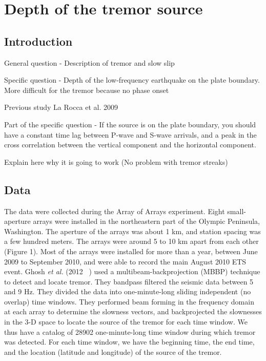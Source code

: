 \documentclass[main.tex]{subfiles}
\begin{document}
\part{Depth of the tremor source}

\chapter{Introduction}

General question - Description of tremor and slow slip

Specific question - Depth of the low-frequency earthquake on the plate boundary. More difficult for the tremor because no phase onset

Previous study La Rocca et al. 2009

Part of the specific question - If the source is on the plate boundary, you should have a constant time lag between P-wave and S-wave arrivals, and a peak in the cross correlation between the vertical component and the horizontal component.

Explain here why it is going to work (No problem with tremor streaks)

\chapter{Data}

The data were collected during the Array of Arrays experiment. Eight small-aperture arrays were installed in the northeastern part of the Olympic Peninsula, Washington. The aperture of the arrays was about 1 km, and station spacing was a few hundred meters. The arrays were around 5 to 10 km apart from each other (Figure 1). Most of the arrays were installed for more than a year, between June 2009 to September 2010, and were able to record the main August 2010 ETS event. Ghosh \textit{et al.} (2012 ~\cite{GHO_2012}) used a multibeam-backprojection (MBBP) technique to detect and locate tremor. They bandpass filtered the seismic data between 5 and 9 Hz. They divided the data into one-minute-long sliding independent (no overlap) time windows. They performed beam forming in the frequency domain at each array to determine the slowness vectors, and backprojected the slownesses in the 3-D space to locate the source of the tremor for each time window. We thus have a catalog of 28902 one-minute-long time window during which tremor was detected. For each time window, we have the beginning time, the end time, and the location (latitude and longitude) of the source of the tremor.
\end{document}
